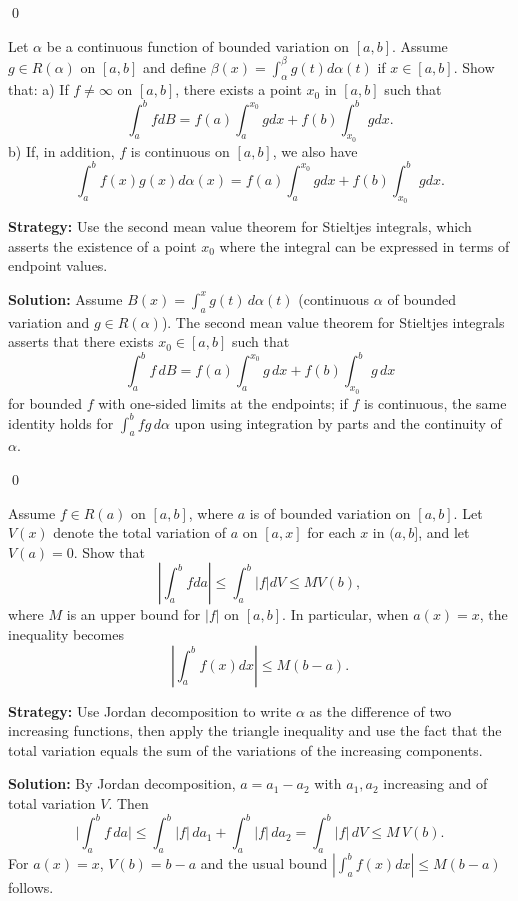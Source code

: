 \qed
\begin{problembox}
Let $\alpha$ be a continuous function of bounded variation on $[a, b]$. Assume $g \in R(\alpha)$ on $[a, b]$ and define $\beta(x) = \int_{\alpha}^{\beta} g(t) d\alpha(t)$ if $x \in [a, b]$. Show that:
a) If $f \neq \infty$ on $[a, b]$, there exists a point $x_0$ in $[a, b]$ such that
\[\int_{a}^{b} f dB = f(a) \int_{a}^{x_0} g dx + f(b) \int_{x_0}^{b} g dx.\]
b) If, in addition, $f$ is continuous on $[a, b]$, we also have
\[\int_{a}^{b} f(x)g(x) d\alpha(x) = f(a) \int_{a}^{x_0} g dx + f(b) \int_{x_0}^{b} g dx.\]
\end{problembox}

\noindent\textbf{Strategy:} Use the second mean value theorem for Stieltjes integrals, which asserts the existence of a point $x_0$ where the integral can be expressed in terms of endpoint values.

\bigskip\noindent\textbf{Solution:}
Assume $B(x)=\int_a^x g(t)\,d\alpha(t)$ (continuous $\alpha$ of bounded variation and $g\in R(\alpha)$). The second mean value theorem for Stieltjes integrals asserts that there exists $x_0\in[a,b]$ such that
\[\int_a^b f\,dB = f(a)\int_a^{x_0} g\,dx + f(b)\int_{x_0}^b g\,dx\]
for bounded $f$ with one-sided limits at the endpoints; if $f$ is continuous, the same identity holds for $\int_a^b f g\,d\alpha$ upon using integration by parts and the continuity of $\alpha$.




\qed
\begin{problembox}
Assume $f \in R(a)$ on $[a, b]$, where $a$ is of bounded variation on $[a, b]$. Let $V(x)$ denote the total variation of $a$ on $[a, x]$ for each $x$ in $(a, b]$, and let $V(a) = 0$. Show that
\[\left| \int_a^b f da \right| \leq \int_a^b |f| dV \leq MV(b),\]
where $M$ is an upper bound for $|f|$ on $[a, b]$. In particular, when $a(x) = x$, the inequality becomes
\[\left| \int_a^b f(x) dx \right| \leq M(b - a).\]
\end{problembox}

\noindent\textbf{Strategy:} Use Jordan decomposition to write $\alpha$ as the difference of two increasing functions, then apply the triangle inequality and use the fact that the total variation equals the sum of the variations of the increasing components.

\bigskip\noindent\textbf{Solution:}
By Jordan decomposition, $a=a_1-a_2$ with $a_1,a_2$ increasing and of total variation $V$. Then
\[\Big|\int_a^b f\,da\Big|\le \int_a^b |f|\,da_1+\int_a^b |f|\,da_2=\int_a^b |f|\,dV\le M\,V(b).
\]
For $a(x)=x$, $V(b)=b-a$ and the usual bound $|\int_a^b f(x)dx|\le M(b-a)$ follows.




